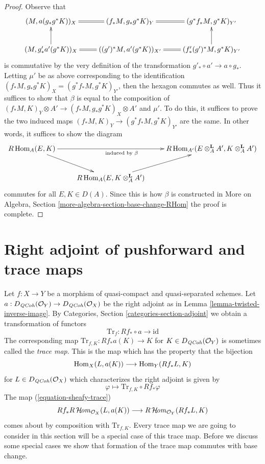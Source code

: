\begin{proof}
\medskip\noindent
Observe that
$$
\xymatrix{
(M, a(g_*g^*K))_X &
(f_*M, g_* g^*K)_Y \ar@{=}[l] &
(g^*f_*M, g^*K)_{Y'} \ar@{=}[l] \\
(M, g'_* a'(g^*K))_X \ar[u] &
((g')^*M, a'(g^*K))_{X'} \ar@{=}[l] &
(f'_*(g')^*M, g^*K)_{Y'} \ar@{=}[l] \ar[u]
}
$$
is commutative by the very definition of the transformation
$g'_* \circ a' \to a \circ g_*$. Letting $\mu'$ be as above
corresponding to the identification
$(f_*M, g_*g^*K)_X = (g^*f_*M, g^*K)_{Y'}$, then the
hexagon commutes as well. Thus it suffices to show that
$\beta$ is equal to the composition of
$(f_*M, K)_Y \otimes A' \to (f_*M, g_*g^*K)_X \otimes A'$
and $\mu'$. To do this, it suffices to prove the two induced maps
$(f_*M, K)_Y \to (g^*f_*M, g^*K)_{Y'}$ are the same.
In other words, it suffices to show the diagram
$$
\xymatrix{
R\Hom_A(E, K) \ar[rr]_{\text{induced by }\beta} \ar[rd] & &
R\Hom_{A'}(E \otimes_A^\mathbf{L} A', K \otimes_A^\mathbf{L} A') \\
& R\Hom_A(E, K \otimes_A^\mathbf{L} A') \ar[ru]
}
$$
commutes for all $E, K \in D(A)$. Since this is how $\beta$ is constructed in
More on Algebra, Section \ref{more-algebra-section-base-change-RHom}
the proof is complete.
\end{proof}








\section{Right adjoint of pushforward and trace maps}
\label{section-trace}

\noindent
Let $f : X \to Y$ be a morphism of quasi-compact and quasi-separated
schemes. Let $a : D_{\mathit{QCoh}}(\mathcal{O}_Y) \to D_{\mathit{QCoh}}(\mathcal{O}_X)$
be the right adjoint as in Lemma \ref{lemma-twisted-inverse-image}. By
Categories, Section \ref{categories-section-adjoint} we obtain a
transformation of functors
$$
\text{Tr}_f : Rf_* \circ a \longrightarrow \text{id}
$$
The corresponding map $\text{Tr}_{f, K} : Rf_*a(K) \longrightarrow K$
for $K \in D_{\mathit{QCoh}}(\mathcal{O}_Y)$ is sometimes called the {\it trace map}.
This is the map which has the property that the bijection
$$
\mathop{\mathrm{Hom}}\nolimits_X(L, a(K)) \longrightarrow \mathop{\mathrm{Hom}}\nolimits_Y(Rf_*L, K)
$$
for $L \in D_{\mathit{QCoh}}(\mathcal{O}_X)$ which characterizes the right adjoint
is given by
$$
\varphi \longmapsto \text{Tr}_{f, K} \circ Rf_*\varphi
$$
The map (\ref{equation-sheafy-trace})
$$
Rf_*R\mathop{\mathcal{H}\!\mathit{om}}\nolimits_{\mathcal{O}_X}(L, a(K))
\longrightarrow
R\mathop{\mathcal{H}\!\mathit{om}}\nolimits_{\mathcal{O}_Y}(Rf_*L, K)
$$
comes about by composition with $\text{Tr}_{f, K}$.
Every trace map we are going to consider in this section will be a
special case of this trace map. Before we discuss some special cases
we show that formation of the trace map commutes with base change.


